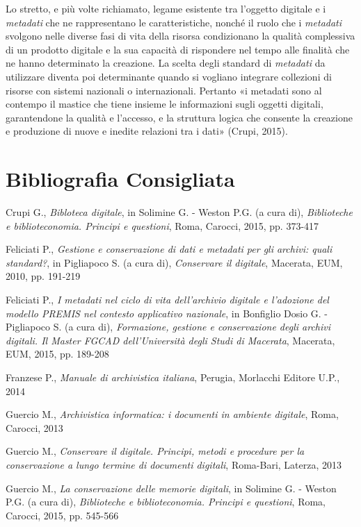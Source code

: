{{Lo stretto, e più volte richiamato, legame esistente tra l'oggetto
digitale e i \emph{metadati} che ne rappresentano le caratteristiche,
nonché il ruolo che i \emph{metadati} svolgono nelle diverse fasi di
vita della risorsa condizionano la qualità complessiva di un prodotto
digitale e la sua capacità di rispondere nel tempo alle finalità che ne
hanno determinato la creazione. La scelta degli standard di
\emph{metadati} da utilizzare diventa poi determinante quando si
vogliano integrare collezioni di risorse con sistemi nazionali o
internazionali. Pertanto «i metadati sono al contempo il mastice che
tiene insieme le informazioni sugli oggetti digitali, garantendone la
qualità e l'accesso, e la struttura logica che consente la creazione e
produzione di nuove e inedite relazioni tra i dati» (Crupi, 2015).

\section*{Bibliografia Consigliata}
{\parindent0pt 
Crupi G., \emph{Bibloteca digitale}, in Solimine G. - Weston P.G. (a
cura di), \emph{Biblioteche e biblioteconomia. Principi e questioni},
Roma, Carocci, 2015, pp. 373-417

Feliciati P., \emph{Gestione e conservazione di dati e metadati per gli
archivi: quali standard?}, in Pigliapoco S. (a cura di),
\emph{Conservare il digitale}, Macerata, EUM, 2010, pp. 191-219

Feliciati P., \emph{I metadati nel ciclo di vita dell'archivio digitale
e l'adozione del modello PREMIS nel contesto applicativo nazionale}, in
Bonfiglio Dosio G. - Pigliapoco S. (a cura di), \emph{Formazione,
gestione e conservazione degli archivi digitali. Il Master FGCAD
dell'Università degli Studi di Macerata}, Macerata, EUM, 2015, pp.
189-208

Franzese P., \emph{Manuale di archivistica italiana}, Perugia, Morlacchi
Editore U.P., 2014

Guercio M., \emph{Archivistica informatica: i documenti in ambiente
digitale}, Roma, Carocci, 2013

Guercio M., \emph{Conservare il digitale. Principi, metodi e procedure
per la conservazione a lungo termine di documenti digitali}, Roma-Bari,
Laterza, 2013

Guercio M., \emph{La conservazione delle memorie digitali}, in Solimine
G. - Weston P.G. (a cura di), \emph{Biblioteche e biblioteconomia.
Principi e questioni}, Roma, Carocci, 2015, pp. 545-566

}}}
